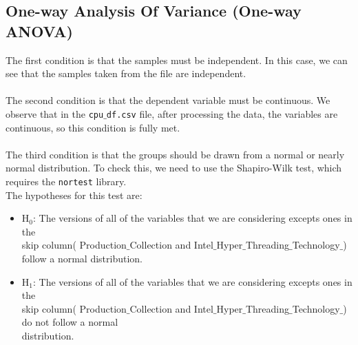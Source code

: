 \documentclass{article}
\begin{document}
	\subsection{One-way Analysis Of Variance (One-way ANOVA)}
	The first condition is that the samples must be independent. In this case, we can see that the samples taken from the file are independent.
	\\\\
	The second condition is that the dependent variable must be continuous. We observe that in the \texttt{cpu$\_$df.csv} file, after processing the data, the variables are continuous, so this condition is fully met.
	\\\\
	The third condition is that the groups should be drawn from a normal or nearly normal distribution. To check this, we need to use the Shapiro-Wilk test, which requires the \texttt{nortest} library.\\ The hypotheses for this test are:
	\begin{itemize}
		\item H$_0$: The versions of all of the variables that we are considering excepts ones in the\\ skip column( Production$\_$Collection and Intel$\_$Hyper$\_$Threading$\_$Technology$\_$) follow a normal distribution.
		\item H$_1$: The versions of all of the variables that we are considering excepts ones in the \\ skip column( Production$\_$Collection and Intel$\_$Hyper$\_$Threading$\_$Technology$\_$) do not follow a normal\\ distribution.
	\end{itemize}
	
\end{document}
